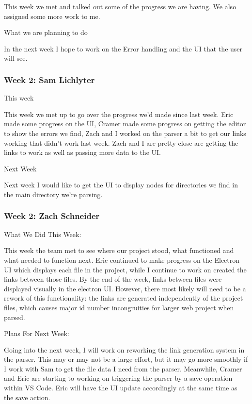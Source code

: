 This week we met and talked out some of the progress we are having. We also assigned some more work to me.



What we are planning to do



In the next week I hope to work on the Error handling and the UI that the user will see. \\ 

 \subsubsection{Week 2: Sam Lichlyter}

This week

This week we met up to go over the progress we'd made since last week. Eric made some progress on the UI, Cramer made some progress on getting the editor to show the errors we find, Zach and I worked on the parser a bit to get our links working that didn't work last week. Zach and I are pretty close are getting the links to work as well as passing more data to the UI.



Next Week

Next week I would like to get the UI to display nodes for directories we find in the main directory we're parsing.  \\ 

 \subsubsection{Week 2: Zach Schneider}

What We Did This Week:

This week the team met to see where our project stood, what functioned and what needed to function next. Eric continued to make progress on the Electron UI which displays each file in the project, while I continue to work on created the links between those files. By the end of the week, links between files were displayed visually in the electron UI. However, there most likely will need to be a rework of this functionality: the links are generated independently of the project files, which causes major id number incongruities for larger web project when parsed.



Plans For Next Week:

Going into the next week, I will work on reworking the link generation system in the parser. This may or may not be a large effort, but it may go more smoothly if I work with Sam to get the file data I need from the parser. Meanwhile, Cramer and Eric are starting to working on triggering the parser by a save operation within VS Code. Eric will have the UI update accordingly at the same time as the save action. \\ 

